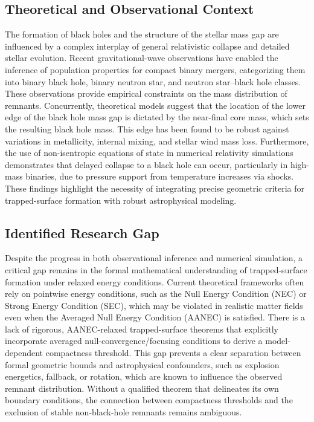 \documentclass[conference]{IEEEtran}
\begin{document}
\subsection{Theoretical and Observational Context}
The formation of black holes and the structure of the stellar mass gap are influenced by a complex interplay of general relativistic collapse and detailed stellar evolution. Recent gravitational-wave observations have enabled the inference of population properties for compact binary mergers, categorizing them into binary black hole, binary neutron star, and neutron star–black hole classes. These observations provide empirical constraints on the mass distribution of remnants. Concurrently, theoretical models suggest that the location of the lower edge of the black hole mass gap is dictated by the near-final core mass, which sets the resulting black hole mass. This edge has been found to be robust against variations in metallicity, internal mixing, and stellar wind mass loss. Furthermore, the use of non-isentropic equations of state in numerical relativity simulations demonstrates that delayed collapse to a black hole can occur, particularly in high-mass binaries, due to pressure support from temperature increases via shocks. These findings highlight the necessity of integrating precise geometric criteria for trapped-surface formation with robust astrophysical modeling.~\cite{cite_fd0f77b2a173c0ab,cite_7a407c865faafd11,cite_7a44e6730c44cb39}

\subsection{Identified Research Gap}
Despite the progress in both observational inference and numerical simulation, a critical gap remains in the formal mathematical understanding of trapped-surface formation under relaxed energy conditions. Current theoretical frameworks often rely on pointwise energy conditions, such as the Null Energy Condition (NEC) or Strong Energy Condition (SEC), which may be violated in realistic matter fields even when the Averaged Null Energy Condition (AANEC) is satisfied. There is a lack of rigorous, AANEC-relaxed trapped-surface theorems that explicitly incorporate averaged null-convergence/focusing conditions to derive a model-dependent compactness threshold. This gap prevents a clear separation between formal geometric bounds and astrophysical confounders, such as explosion energetics, fallback, or rotation, which are known to influence the observed remnant distribution. Without a qualified theorem that delineates its own boundary conditions, the connection between compactness thresholds and the exclusion of stable non-black-hole remnants remains ambiguous.~\cite{cite_7a44e6730c44cb39,cite_7a407c865faafd11}
\end{document}
